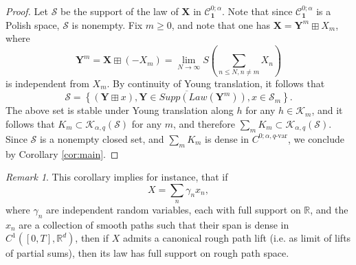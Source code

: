 \documentclass[12pt,a4paper]{article}
\numberwithin{equation}{section}
\def\cK{\mathcal{K}}\def\cC{\mathcal{C}}
\def\cS{\mathcal{S}}\def\cD{\mathcal{D}}
\def\bR{\mathbb{R}}\def\bS{\mathbb{S}}
\theoremstyle{plain}
\theoremstyle{definition}
\theoremstyle{remark}
\newtheorem{remark}[theorem]{Remark}
\begin{document}
\begin{proof}

Let $\mathcal{S}$ be the support of the law of $\mathbf{X}$ in $\mathcal{C}^{0;\alpha}_{\mathbf{1}}$. Note that since $\mathcal{C}^{0;\alpha}_{\mathbf{1}}$ is a Polish space, $\mathcal{S}$ is nonempty. Fix $m \geq 0$, and note that one has $\mathbf{X} =  \mathbf{Y}^m \boxplus X_m$, where 
\[\mathbf{Y}^m = \mathbf{X} \boxplus (- X_m) = \lim_{N\to\infty} S\left( \sum_{n \leq N, n \neq m} X_n\right)\] is independent from $X_m$. By continuity of Young translation, it follows that
\[
\mathcal{S} = \overline{ \left\{  (\mathbf{Y}\boxplus x), \mathbf{Y} \in Supp(Law(\mathbf{Y}^{m})) , x \in \cS_m  \right\}}.
\]
The above set is stable under Young translation along $h$ for any $h \in \cK_m$, and it follows that $K_m \subset \cK_{\alpha,q}(\mathcal{S})$ for any $m$, and therefore $\sum_m K_m \subset \cK_{\alpha,q}(\mathcal{S})$. Since $ \mathcal{S}$ is a nonempty closed set, and $\sum_m K_m$ is dense in $C^{0;\alpha,q\text{-var}}$, we conclude by Corollary \ref{cor:main}.

%
%
%
%
\end{proof}
\begin{remark}
This corollary implies for instance, that if
\[
X = \sum_{n} \gamma_n x_n,
\]
where $\gamma_n$ are independent random variables, each with full support on $\bR$, and the $x_n$ are a collection of smooth paths such that their span is dense in $C^1([0,T],\bR^d)$, then if $X$ admits a canonical rough path lift (i.e. as limit of lifts of partial sums), then its law has full support on rough path space.
\end{remark}
\end{document}

